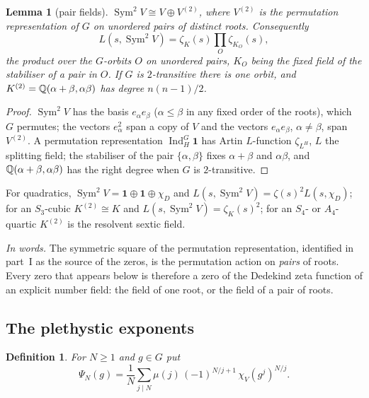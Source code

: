 \documentclass[11pt,a4paper]{article}
\newtheorem{lemma}[theorem]{Lemma}
\newtheorem{definition}[theorem]{Definition}
\theoremstyle{remark}\newtheorem{remark}[theorem]{Remark}
\newcommand{\Sym}{\operatorname{Sym}}\newcommand{\Res}{\operatorname*{Res}}
\begin{document}
\begin{lemma}[pair fields]\label{lem:pairs}
$\Sym^2V\cong V\oplus V^{(2)}$, where $V^{(2)}$ is the permutation representation of $G$ on unordered pairs
of distinct roots. Consequently
\[
L(s,\Sym^2V)=\zeta_K(s)\prod_{O}\zeta_{K_O}(s),
\]
the product over the $G$-orbits $O$ on unordered pairs, $K_O$ being the fixed field of the stabiliser of a
pair in $O$. If $G$ is $2$-transitive there is one orbit, and $K^{(2)}=\mathbb{Q}(\alpha+\beta,\alpha\beta)$ has
degree $n(n-1)/2$.
\end{lemma}
\begin{proof}
$\Sym^2V$ has the basis $e_\alpha e_\beta$ ($\alpha\le\beta$ in any fixed order of the roots), which $G$
permutes; the vectors $e_\alpha^2$ span a copy of $V$ and the vectors $e_\alpha e_\beta$, $\alpha\ne\beta$,
span $V^{(2)}$. A permutation representation $\operatorname{Ind}_H^G\mathbf 1$ has Artin $L$-function
$\zeta_{L^H}$, $L$ the splitting field; the stabiliser of the pair $\{\alpha,\beta\}$ fixes
$\alpha+\beta$ and $\alpha\beta$, and $\mathbb{Q}(\alpha+\beta,\alpha\beta)$ has the right degree when $G$ is
$2$-transitive.
\end{proof}

For quadratics, $\Sym^2V=\mathbf 1\oplus\mathbf 1\oplus\chi_D$ and $L(s,\Sym^2V)=\zeta(s)^2L(s,\chi_D)$; for an
$S_3$-cubic $K^{(2)}\cong K$ and $L(s,\Sym^2V)=\zeta_K(s)^2$; for an $S_4$- or $A_4$-quartic $K^{(2)}$ is the
resolvent sextic field.

\emph{In words.} The symmetric square of the permutation representation, identified in part~I as the
source of the zeros, is the permutation action on \emph{pairs} of roots. Every zero that appears below is
therefore a zero of the Dedekind zeta function of an explicit number field: the field of one root, or the
field of a pair of roots.

\subsection{The plethystic exponents}

\begin{definition}\label{def:psi}
For $N\ge1$ and $g\in G$ put
\[
\Psi_N(g)=\frac1N\sum_{j\mid N}\mu(j)\,(-1)^{N/j+1}\,\chi_V(g^j)^{N/j}.
\]
\end{definition}
\end{document}
